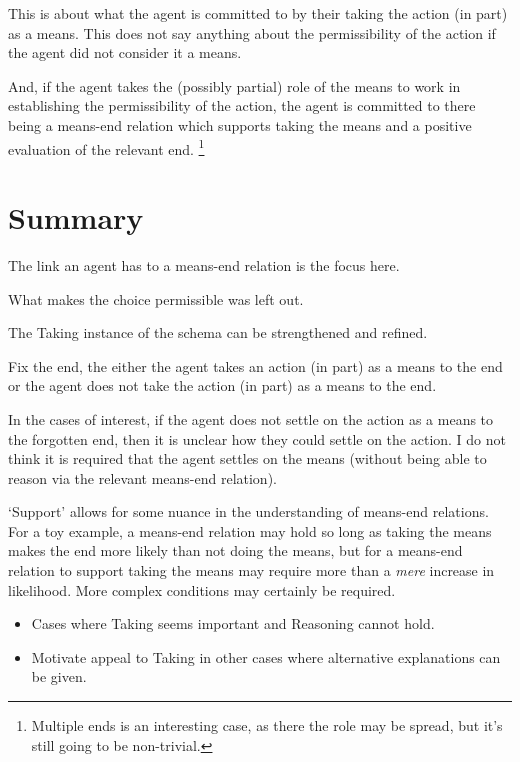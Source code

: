 \documentclass[10pt]{article}
\newcommand{\hand}{\ding{43}}
\newcommand{\schemaName}[1]{\textsf{#1}}
\begin{document}
This is about what the agent is committed to by their taking the action (in part) as a means.
This does not say anything about the permissibility of the action if the agent did not consider it a means.

And, if the agent takes the (possibly partial) role of the means to work in establishing the permissibility of the action, the agent is committed to there being a means-end relation which supports taking the means and a positive evaluation of the relevant end.\nolinebreak
\footnote{Multiple ends is an interesting case, as there the role may be spread, but it's still going to be non-trivial.}

\newpage


\section{Summary}
\label{sec:summary}


The link an agent has to a means-end relation is the focus here.

What makes the choice permissible was left out.

The \schemaName{Taking} instance of the schema can be strengthened and refined.


Fix the end, the either the agent takes an action (in part) as a means to the end or the agent does not take the action (in part) as a means to the end.

In the cases of interest, if the agent does not settle on the action as a means to the forgotten end, then it is unclear how they could settle on the action.
I do not think it is required that the agent settles on the means (without being able to reason via the relevant means-end relation).


`Support' allows for some nuance in the understanding of means-end relations.
For a toy example, a means-end relation may hold so long as taking the means makes the end more likely than not doing the means, but for a means-end relation to support taking the means may require more than a \emph{mere} increase in likelihood.
More complex conditions may certainly be required.



\begin{itemize}
\item[\hand] Cases where \schemaName{Taking} seems important and \schemaName{Reasoning} cannot hold.
\item Motivate appeal to \schemaName{Taking} in other cases where alternative explanations can be given.
\end{itemize}
\end{document}
